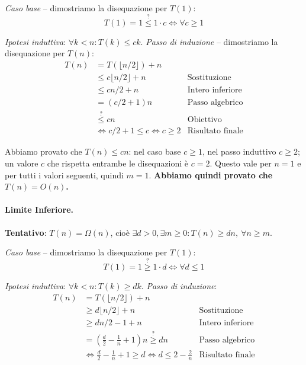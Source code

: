 \documentclass[12pt, a4paper]{article}
\begin{document}
\textit{Caso base} -- dimostriamo la disequazione per $T(1)$:
$$T(1)=1 \overset{?}{\le} 1\cdot c \iff \forall c\ge 1$$

\textit{Ipotesi induttiva}: $\forall k<n: T(k)\le ck$. \textit{Passo di induzione} -- dimostriamo la disequazione per $T(n)$:
\begin{align*}
T(n) &= T(\lfloor n/2\rfloor)+n \\
     &\le c\lfloor n/2\rfloor + n & \text{Sostituzione} \\
     &\le cn/2 + n & \text{Intero inferiore} \\
     &= (c/2+1)n & \text{Passo algebrico} \\
     &\overset{?}{\le} cn & \text{Obiettivo} \\
     &\iff c/2+1\le c \iff c\ge 2 & \text{Risultato finale}
\end{align*}

\begin{tcolorbox}[colback=lightergray!5, colframe=tocsubsec, title=\textbf{Conclusione}]
Abbiamo provato che $T(n)\le cn$: nel caso base $c\ge 1$, nel passo induttivo $c\ge 2$; un valore $c$ che rispetta entrambe le disequazioni è $c=2$. Questo vale per $n=1$ e per tutti i valori seguenti, quindi $m=1$. \textbf{Abbiamo quindi provato che $T(n)=O(n)$.}
\end{tcolorbox}

\paragraph{Limite Inferiore.} \textbf{Tentativo}: $T(n)=\Omega(n)$, cioè $\exists d>0,\exists m\ge 0: T(n)\ge dn,\ \forall n\ge m$.

\textit{Caso base} -- dimostriamo la disequazione per $T(1)$:
$$T(1)=1 \overset{?}{\ge} 1\cdot d \iff \forall d\le 1$$

\textit{Ipotesi induttiva}: $\forall k<n: T(k)\ge dk$. \textit{Passo di induzione}:
\begin{align*}
T(n) &= T(\lfloor n/2\rfloor)+n \\
     &\ge d\lfloor n/2\rfloor + n & \text{Sostituzione} \\
     &\ge dn/2 - 1 + n & \text{Intero inferiore} \\
     &= \left(\frac{d}{2}-\frac{1}{n}+1\right)n \overset{?}{\ge} dn & \text{Passo algebrico} \\
     &\iff \frac{d}{2}-\frac{1}{n}+1\ge d \iff d\le 2-\frac{2}{n} & \text{Risultato finale}
\end{align*}
\end{document}
